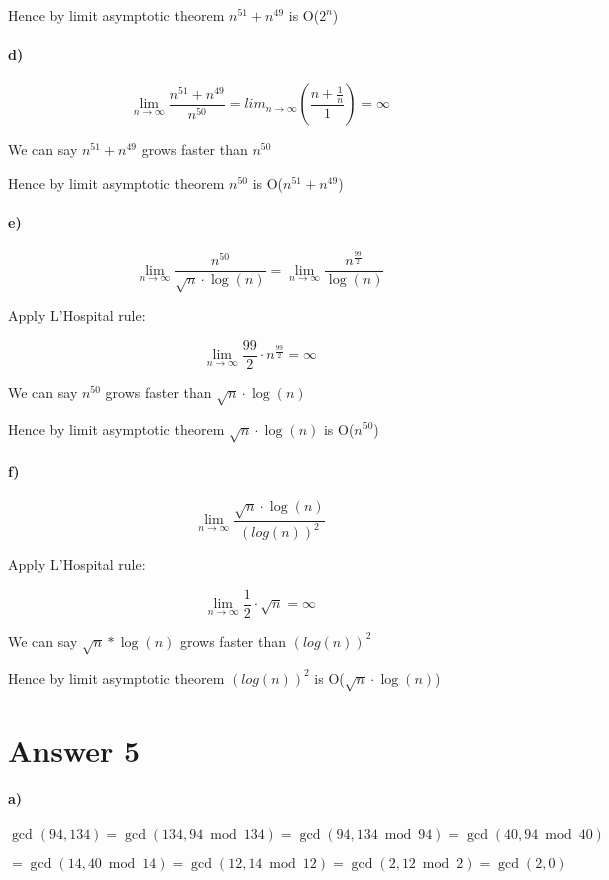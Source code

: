 \documentclass[12pt]{article}
\begin{document}
Hence by limit asymptotic theorem $n^{51}+n^{49}$ is O($2^n$) 

\paragraph{d)}
$$\lim_{n \to \infty} \frac{n^{51}+n^{49}}{n^{50}} =lim_{n\to \infty} ( \frac{n+\frac{1}{n}}{1})=\infty$$

We can say $n^{51}+n^{49}$ grows faster than $n^{50}$

Hence by limit asymptotic theorem $n^{50}$ is O($n^{51}+n^{49}$) 
\paragraph{e)}
$$\lim_{n \to \infty} \frac{n^{50}}{\sqrt{n}\cdot\log(n)}=
\lim_{n \to \infty} \frac{n^{\frac{99}{2}}}{\log(n)}$$

Apply L'Hospital rule:

$$\lim_{n \to \infty} {\frac{99}{2}}\cdot n^{\frac{99}{2}} = \infty$$

We can say $n^{50}$ grows faster than $\sqrt{n}\cdot\log(n)$

Hence by limit asymptotic theorem $\sqrt{n}\cdot\log(n)$ is O($n^{50}$) 

\paragraph{f)}
$$\lim_{n \to \infty} \frac{\sqrt{n}\cdot\log(n)}{(log(n))^2}$$

Apply L'Hospital rule:

$$\lim_{n \to \infty} \frac{1}{2}\cdot \sqrt{n} = \infty$$

We can say $\sqrt{n}*\log(n)$ grows faster than $(log(n))^2$

Hence by limit asymptotic theorem $(log(n))^2$ is O($\sqrt{n}\cdot\log(n)$) 

\section*{Answer 5}
\paragraph{a)}
$$\gcd(94,134) =\gcd(134,94\bmod{134}) =\gcd(94,134\bmod94) =\gcd(40,94\bmod 40)$$ 

$$=\gcd(14,40\bmod14)=\gcd(12,14\bmod12) =\gcd(2,12\bmod2) =\gcd(2,0)$$
\end{document}
